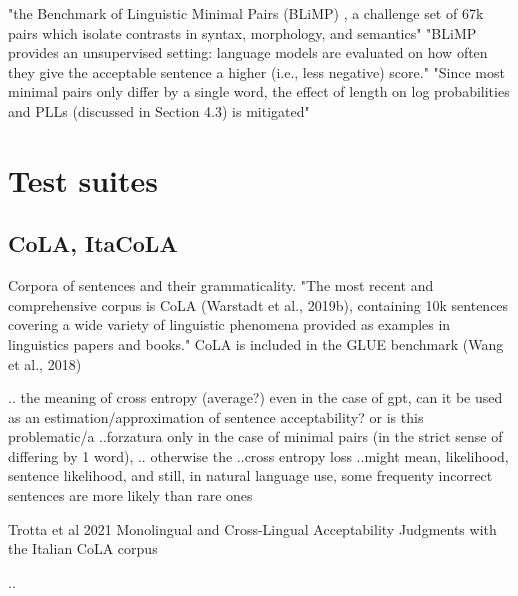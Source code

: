 
"the Benchmark of Linguistic Minimal Pairs (BLiMP) \citep{warstadt2020blimp}, a
challenge set of 67k pairs which isolate contrasts in syntax, morphology, and semantics"  \citep{salazar2020masked} 
"BLiMP provides an unsupervised setting: language models are evaluated on how often they give the acceptable sentence a higher (i.e., less
negative) score." \citep{salazar2020masked} 
"Since most minimal pairs only differ by a single
word, the effect of length on log probabilities and
PLLs (discussed in Section 4.3) is mitigated"  \citep{salazar2020masked} 


\section{Test suites}
\subsection{CoLA, ItaCoLA}


Corpora of sentences and their grammaticality. "The most recent
and comprehensive corpus is CoLA (Warstadt et al., 2019b), containing 10k sentences covering a wide variety of linguistic phenomena provided as examples in linguistics papers and books."\citep{warstadt2020blimp}	
CoLA is included in the GLUE benchmark (Wang et al., 2018)

..
the meaning of cross entropy (average?)
even in the case of gpt, can it be used as an estimation/approximation of sentence acceptability?
or is this problematic/a ..forzatura
only in the case of minimal pairs (in the strict sense of differing by 1 word), ..
otherwise the ..cross entropy loss ..might mean, likelihood, sentence likelihood, and still, in natural language use, some frequenty incorrect sentences are more likely than rare ones

Trotta et al 2021 Monolingual and Cross-Lingual Acceptability Judgments with the Italian CoLA corpus

..

